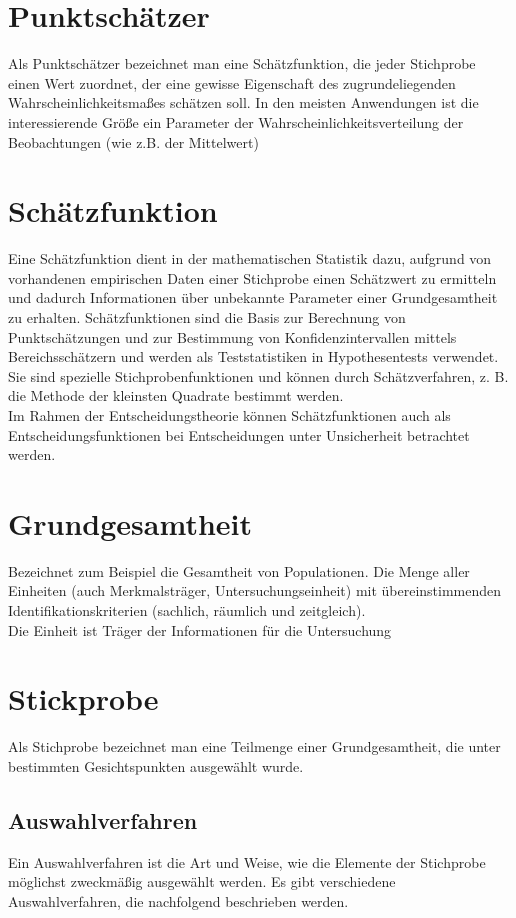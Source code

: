 \section{Punktschätzer}
Als Punktschätzer bezeichnet man eine Schätzfunktion, die jeder Stichprobe einen Wert zuordnet, der eine gewisse Eigenschaft des zugrundeliegenden Wahrscheinlichkeitsmaßes schätzen soll. In den meisten Anwendungen ist die interessierende Größe ein Parameter der Wahrscheinlichkeitsverteilung der Beobachtungen (wie z.B. der Mittelwert)

\section{Schätzfunktion}
Eine Schätzfunktion dient in der mathematischen Statistik dazu, aufgrund von vorhandenen empirischen Daten einer Stichprobe einen Schätzwert zu ermitteln und dadurch Informationen über unbekannte Parameter einer Grundgesamtheit zu erhalten. Schätzfunktionen sind die Basis zur Berechnung von Punktschätzungen und zur Bestimmung von Konfidenzintervallen mittels Bereichsschätzern und werden als Teststatistiken in Hypothesentests verwendet. Sie sind spezielle Stichprobenfunktionen und können durch Schätzverfahren, z. B. die Methode der kleinsten Quadrate  bestimmt werden.\\
Im Rahmen der Entscheidungstheorie können Schätzfunktionen auch als Entscheidungsfunktionen bei Entscheidungen unter Unsicherheit betrachtet werden.

\section{Grundgesamtheit}
Bezeichnet zum Beispiel die Gesamtheit von Populationen.
Die Menge aller Einheiten (auch Merkmalsträger, Untersuchungseinheit) mit übereinstimmenden Identifikationskriterien
(sachlich, räumlich und zeitgleich). \\
Die Einheit ist Träger der Informationen für die Untersuchung

\section{Stickprobe}
Als Stichprobe bezeichnet man eine Teilmenge einer Grundgesamtheit, die unter bestimmten Gesichtspunkten ausgewählt wurde.
\subsection{Auswahlverfahren}
Ein Auswahlverfahren ist die Art und Weise, wie die Elemente der Stichprobe möglichst zweckmäßig ausgewählt werden. Es gibt verschiedene Auswahlverfahren, die nachfolgend beschrieben werden.
